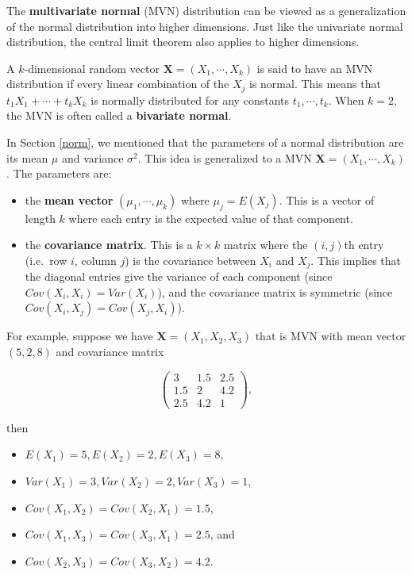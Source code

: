 \documentclass[
]{book}
\providecommand{\tightlist}{%
  \setlength{\itemsep}{0pt}\setlength{\parskip}{0pt}}
\begin{document}
The \textbf{multivariate normal} (MVN) distribution can be viewed as a generalization of the normal distribution into higher dimensions. Just like the univariate normal distribution, the central limit theorem also applies to higher dimensions.

A \(k\)-dimensional random vector \(\boldsymbol{X} = (X_1, \cdots, X_k)\) is said to have an MVN distribution if every linear combination of the \(X_j\) is normal. This means that \(t_1 X_1 + \cdots + t_k X_k\) is normally distributed for any constants \(t_1, \cdots, t_k\). When \(k=2\), the MVN is often called a \textbf{bivariate normal}.

In Section \ref{norm}, we mentioned that the parameters of a normal distribution are its mean \(\mu\) and variance \(\sigma^2\). This idea is generalized to a MVN \(\boldsymbol{X} = (X_1, \cdots, X_k)\). The parameters are:

\begin{itemize}
\item
  the \textbf{mean vector} \((\mu_1, \cdots, \mu_k)\) where \(\mu_j = E(X_j)\). This is a vector of length \(k\) where each entry is the expected value of that component.
\item
  the \textbf{covariance matrix}. This is a \(k \times k\) matrix where the \((i,j)\)th entry (i.e.~row \(i\), column \(j\)) is the covariance between \(X_i\) and \(X_j\). This implies that the diagonal entries give the variance of each component (since \(Cov(X_i, X_i) = Var(X_i)\)), and the covariance matrix is symmetric (since \(Cov(X_i, X_j) = Cov(X_j, X_i)\)).
\end{itemize}

For example, suppose we have \(\boldsymbol{X} = (X_1, X_2, X_3)\) that is MVN with mean vector \((5, 2, 8)\) and covariance matrix

\[
\begin{pmatrix}
3 & 1.5 & 2.5\\
1.5 & 2 & 4.2 \\
2.5 & 4.2 & 1
\end{pmatrix},
\]

then

\begin{itemize}
\tightlist
\item
  \(E(X_1) = 5, E(X_2) = 2, E(X_3) = 8\),
\item
  \(Var(X_1) = 3, Var(X_2) = 2, Var(X_3) = 1\),
\item
  \(Cov(X_1, X_2) = Cov(X_2, X_1) = 1.5\),
\item
  \(Cov(X_1, X_3) = Cov(X_3, X_1) = 2.5\), and
\item
  \(Cov(X_2, X_3) = Cov(X_3, X_2) = 4.2\).
\end{itemize}
\end{document}
